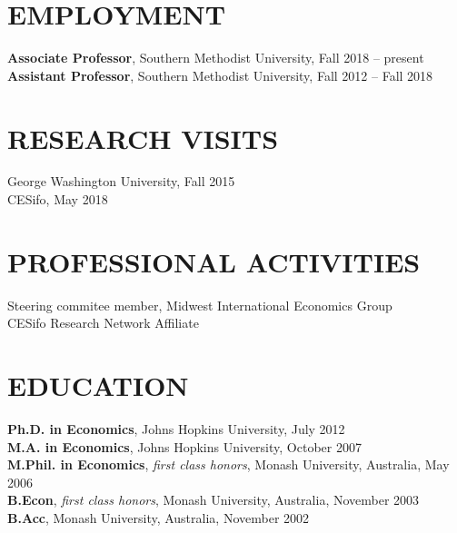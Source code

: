 \documentclass[11pt]{res}
\begin{document}
\begin{resume}
\hspace{-0.5in}\makebox[6.1in]{\hrulefill}

\section{EMPLOYMENT} \vspace{1.5mm}
{\bf Associate Professor}, Southern Methodist University, Fall 2018 -- present\\
{\bf Assistant Professor}, Southern Methodist University, Fall 2012 -- Fall 2018

\section{RESEARCH VISITS} \vspace{1.5mm}
George Washington University, Fall 2015\vspace{1.5mm}\\
CESifo, May 2018

\section{PROFESSIONAL ACTIVITIES} \vspace{1.5mm}
Steering commitee member, Midwest International Economics Group\\
CESifo Research Network Affiliate

\section{EDUCATION} \vspace{1.5mm}
    {\bf Ph.D. in Economics}, Johns Hopkins University, July 2012 \vspace{1.5mm}\\
    {\bf M.A. in Economics}, Johns Hopkins University, October 2007\vspace{1.5mm}\\
    {\bf M.Phil. in Economics}, \emph{first class honors}, Monash University, Australia, May 2006\vspace{1.5mm}\\
    {\bf B.Econ}, \emph{first class honors}, Monash University, Australia, November 2003\vspace{1.5mm}\\
    {\bf B.Acc}, Monash University, Australia, November 2002



\end{resume}
\end{document}
